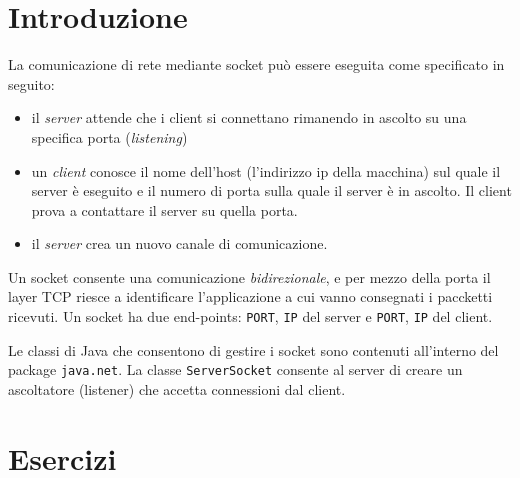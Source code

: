 \documentclass{article}
\begin{document}
\maketitle



\newpage
\tableofcontents
\newpage



\section{Introduzione}
La comunicazione di rete mediante socket pu\`o essere eseguita come specificato in seguito:
\begin{itemize}
\item il \emph{server}  attende che i client si connettano rimanendo in ascolto su una specifica porta (\emph{listening}) 
\item un \emph{client} conosce il nome dell'host (l'indirizzo ip della macchina) sul quale il server \`e eseguito e il numero di porta sulla quale il server \`e in ascolto. Il client prova a contattare il server su quella porta. 
\item il \emph{server} crea un nuovo canale di comunicazione.
\end{itemize} 

Un socket consente una comunicazione \emph{bidirezionale}, e per mezzo della porta il layer TCP riesce a identificare l'applicazione a cui vanno consegnati i paccketti ricevuti. Un socket ha due end-points: \texttt{PORT}, \texttt{IP} del server e \texttt{PORT}, \texttt{IP} del client.

Le classi di Java che consentono di gestire i socket sono contenuti all'interno del package \texttt{java.net}. La classe \texttt{ServerSocket} consente al server di creare un ascoltatore (listener) che accetta connessioni dal client.



\section{Esercizi}
\end{document}
